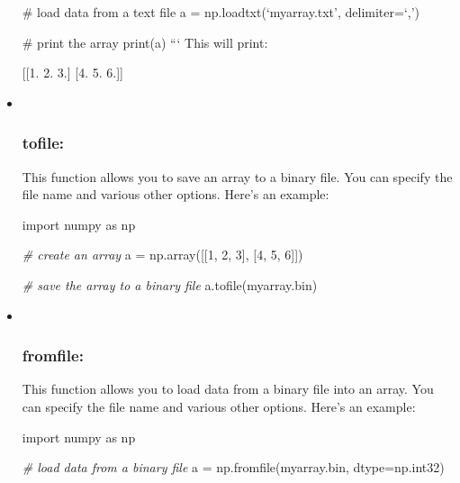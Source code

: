 \documentclass[11pt]{article}
\newenvironment{Shaded}{}{}
\newcommand{\DecValTok}[1]{\textcolor[rgb]{0.25,0.63,0.44}{{#1}}}
\newcommand{\FloatTok}[1]{\textcolor[rgb]{0.25,0.63,0.44}{{#1}}}
\newcommand{\StringTok}[1]{\textcolor[rgb]{0.25,0.44,0.63}{{#1}}}
\newcommand{\CommentTok}[1]{\textcolor[rgb]{0.38,0.63,0.69}{\textit{{#1}}}}
\newcommand{\NormalTok}[1]{{#1}}
\newcommand{\ImportTok}[1]{{#1}}
\newcommand{\OperatorTok}[1]{\textcolor[rgb]{0.40,0.40,0.40}{{#1}}}
\begin{document}
\begin{itemize}
  \# load data from a text file a = np.loadtxt(`myarray.txt',
  delimiter=`,')

  \# print the array print(a) ``` This will print:

\begin{Shaded}
\begin{Highlighting}[]
\NormalTok{[[}\FloatTok{1.} \FloatTok{2.} \FloatTok{3.}\NormalTok{]}
\NormalTok{ [}\FloatTok{4.} \FloatTok{5.} \FloatTok{6.}\NormalTok{]]}
\end{Highlighting}
\end{Shaded}
\item ~
  \hypertarget{tofile}{%
  \subsubsection{tofile:}\label{tofile}}

  This function allows you to save an array to a binary file. You can
  specify the file name and various other options. Here's an example:

\begin{Shaded}
\begin{Highlighting}[]
\ImportTok{import}\NormalTok{ numpy }\ImportTok{as}\NormalTok{ np}

\CommentTok{\# create an array}
\NormalTok{a }\OperatorTok{=}\NormalTok{ np.array([[}\DecValTok{1}\NormalTok{, }\DecValTok{2}\NormalTok{, }\DecValTok{3}\NormalTok{], [}\DecValTok{4}\NormalTok{, }\DecValTok{5}\NormalTok{, }\DecValTok{6}\NormalTok{]])}

\CommentTok{\# save the array to a binary file}
\NormalTok{a.tofile(}\StringTok{\textquotesingle{}myarray.bin\textquotesingle{}}\NormalTok{)}
\end{Highlighting}
\end{Shaded}
\item ~
  \hypertarget{fromfile}{%
  \subsubsection{fromfile:}\label{fromfile}}

  This function allows you to load data from a binary file into an
  array. You can specify the file name and various other options. Here's
  an example:

\begin{Shaded}
\begin{Highlighting}[]
\ImportTok{import}\NormalTok{ numpy }\ImportTok{as}\NormalTok{ np}

\CommentTok{\# load data from a binary file}
\NormalTok{a }\OperatorTok{=}\NormalTok{ np.fromfile(}\StringTok{\textquotesingle{}myarray.bin\textquotesingle{}}\NormalTok{, dtype}\OperatorTok{=}\NormalTok{np.int32)}


\end{Highlighting}
\end{Shaded}
\end{itemize}
\end{document}
